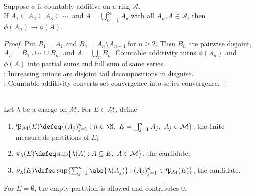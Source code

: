 \begin{theorem} \label{thm:continuity-from-below-set-functions} \\
Suppose $\phi$ is countably additive on a ring $\mathcal{A}$.\\
If $A_1\subseteq A_2\subseteq A_3\subseteq\cdots$, and $A=\bigcup\limits_{n=1}^{\infty}A_n$ with all $A_n,A\in\mathcal{A}$, then $\phi(A_n)\to\phi(A)$.
\begin{proof}
Put $B_1=A_1$ and $B_n=A_n\setminus A_{n-1}$ for $n\geq2$. Then $B_n$ are pairwise disjoint, $A_n=B_1\cup\cdots\cup B_n$, and $A=\bigcup_nB_n$. Countable additivity turns $\phi(A_n)$ and $\phi(A)$ into partial sums and full sum of same series.\\
: Increasing unions are disjoint tail decompositions in disguise.\\
: Countable additivity converts set convergence into series convergence.
\end{proof}
\end{theorem}

\begin{definition} \label{def:charges-and-variation-measures} \\
Let $\lambda$ be a charge on $\mathcal{M}$. For $E\in\mathcal{M}$, define
\begin{enumerate}[label=(\roman*)]
\setlength{\itemsep}{0pt}
\item $\mathfrak{P}_{\mathcal{M}}(E)\defeq\{(A_j)_{j=1}^{n}:n\in\N,\ E=\bigsqcup_{j=1}^{n}A_j,\ A_j\in\mathcal{M}\}$, the finite measurable partitions of $E$;
\item $\pi_\lambda(E)\defeq\sup\{\lambda(A):A\subseteq E,\ A\in\mathcal{M}\}$, the  candidate;
\item $\nu_\lambda(E)\defeq\sup\{\sum_{j=1}^{n}\abs{\lambda(A_j)}:(A_j)_{j=1}^{n}\in\mathfrak{P}_{\mathcal{M}}(E)\}$, the  candidate.
\end{enumerate}
For $E=\emptyset$, the empty partition is allowed and contributes $0$.
\end{definition}

